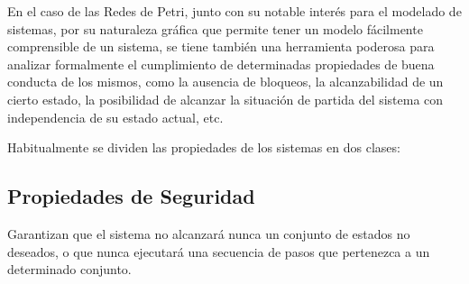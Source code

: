 En el caso de las Redes de Petri, junto con su notable inter\'{e}s para
el modelado de sistemas, por su naturaleza gr\'{a}fica que permite
tener un modelo f\'{a}cilmente comprensible de un sistema,
se tiene tambi\'{e}n una herramienta poderosa para analizar formalmente
el cumplimiento de determinadas propiedades de buena conducta
de los mismos,
como la ausencia de bloqueos, la alcanzabilidad de un cierto
estado, la posibilidad de alcanzar la situaci\'{o}n de partida
del sistema con independencia de su estado actual, etc.

\medskip
Habitualmente se dividen las propiedades de los sistemas en dos
clases:

\subsection{Propiedades de Seguridad}

Garantizan que el sistema no
alcanzar\'{a} nunca un conjunto de estados no deseados, o
que nunca ejecutar\'{a} una secuencia de pasos que pertenezca a un
determinado conjunto.

